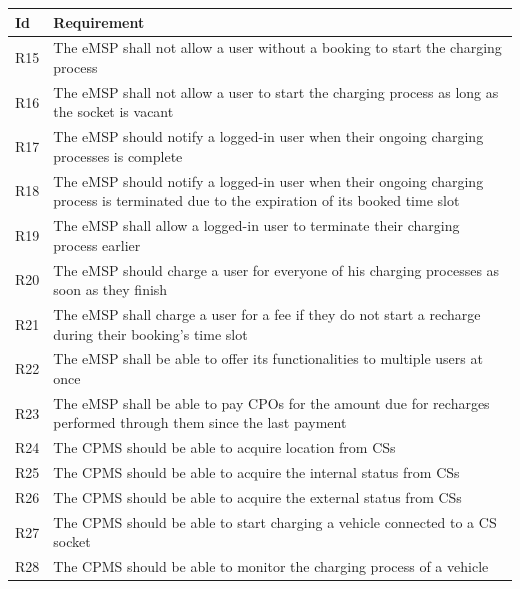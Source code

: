 \documentclass[11pt]{article}
\begin{document}
\begin{table}[H]
    \centering
    \setlength{\tabcolsep}{18pt}
    \renewcommand{\arraystretch}{1.2}
    \begin{tabularx}{\textwidth}{|>{\centering\hsize=0.1\hsize}X|>{\hsize=1.9\hsize}X|}
        \hline
        \textbf{Id} & \textbf{Requirement} \\
        \hline
        R15 & The eMSP shall not allow a user without a booking to start the charging process \\
        \hline
        R16 & The eMSP shall not allow a user to start the charging process as long as the socket is vacant \\
        \hline
        R17 & The eMSP should notify a logged-in user when their ongoing charging processes is complete \\
        \hline
        R18 & The eMSP should notify a logged-in user when their ongoing charging process is terminated due to the expiration of its booked time slot \\
        \hline
        R19 & The eMSP shall allow a logged-in user to terminate their charging process earlier \\
        \hline
        R20 & The eMSP should charge a user for everyone of his charging processes as soon as they finish \\
        \hline
        R21 & The eMSP shall charge a user for a fee if they do not start a recharge during their booking's time slot \\
        \hline
        R22 & The eMSP shall be able to offer its functionalities to multiple users at once \\
        \hline
        R23 & The eMSP shall be able to pay CPOs for the amount due for recharges performed through them since the last payment \\
        \hline
        R24 & The CPMS should be able to acquire location from CSs \\
        \hline
        R25 & The CPMS should be able to acquire the internal status from CSs \\
        \hline
        R26 & The CPMS should be able to acquire the external status from CSs \\
        \hline
        R27 & The CPMS should be able to start charging a vehicle connected to a CS socket \\
        \hline
        R28 & The CPMS should be able to monitor the charging process of a vehicle \\

\end{tabularx}
\end{table}
\end{document}
